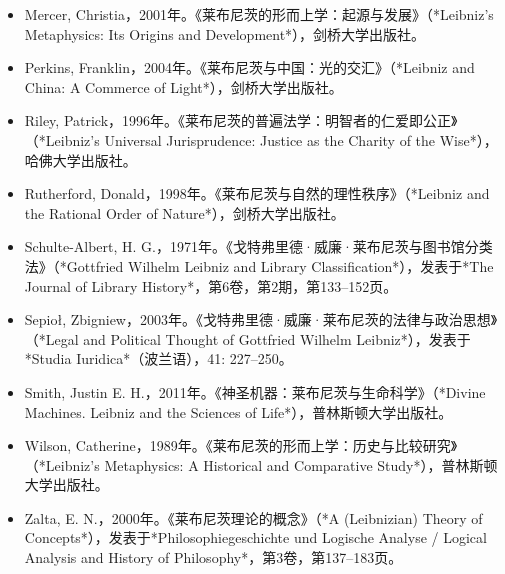\begin{itemize}
\item Mercer, Christia，2001年。《莱布尼茨的形而上学：起源与发展》（*Leibniz's Metaphysics: Its Origins and Development*），剑桥大学出版社。  
\item Perkins, Franklin，2004年。《莱布尼茨与中国：光的交汇》（*Leibniz and China: A Commerce of Light*），剑桥大学出版社。  
\item Riley, Patrick，1996年。《莱布尼茨的普遍法学：明智者的仁爱即公正》（*Leibniz's Universal Jurisprudence: Justice as the Charity of the Wise*），哈佛大学出版社。  
\item Rutherford, Donald，1998年。《莱布尼茨与自然的理性秩序》（*Leibniz and the Rational Order of Nature*），剑桥大学出版社。  
\item Schulte-Albert, H. G.，1971年。《戈特弗里德·威廉·莱布尼茨与图书馆分类法》（*Gottfried Wilhelm Leibniz and Library Classification*），发表于*The Journal of Library History*，第6卷，第2期，第133–152页。  
\item Sepioł, Zbigniew，2003年。《戈特弗里德·威廉·莱布尼茨的法律与政治思想》（*Legal and Political Thought of Gottfried Wilhelm Leibniz*），发表于*Studia Iuridica*（波兰语），41: 227–250。  
\item Smith, Justin E. H.，2011年。《神圣机器：莱布尼茨与生命科学》（*Divine Machines. Leibniz and the Sciences of Life*），普林斯顿大学出版社。  
\item Wilson, Catherine，1989年。《莱布尼茨的形而上学：历史与比较研究》（*Leibniz's Metaphysics: A Historical and Comparative Study*），普林斯顿大学出版社。  
\item Zalta, E. N.，2000年。《莱布尼茨理论的概念》（*A (Leibnizian) Theory of Concepts*），发表于*Philosophiegeschichte und Logische Analyse / Logical Analysis and History of Philosophy*，第3卷，第137–183页。
\end{itemize}
